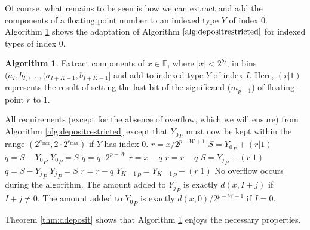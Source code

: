 \documentclass[12pt]{article}
\providecommand{\F}{\ensuremath{\mathbb{F}}}
\providecommand{\max}{\ensuremath{\text{max}}}
\providecommand{\To}{\ensuremath{\text{ to }}}
\theoremstyle{definition}
\newtheorem{alg}{Algorithm}[section]
\numberwithin{equation}{section}
\numberwithin{figure}{section}
\begin{document}
      Of course, what remains to be seen is how we can extract and add the components of a floating point number to an indexed type $Y$ of index 0. Algorithm \ref{alg:deposit} shows the adaptation of Algorithm $\ref{alg:depositrestricted}$ for indexed types of index 0.

      \begin{samepage}
      \begin{alg}
        Extract components of $x \in \F$, where $|x| < 2^{b_I}$, in bins $(a_I, b_I], ..., (a_{I + K - 1}, b_{I + K - 1}]$ and add to indexed type $Y$ of index $I$. Here, $(r | 1)$ represents the result of setting the last bit of the significand ($m_{p - 1}$) of floating-point $r$ to 1.
        \begin{algorithmic}[1]
          \Require
            \Statex All requirements (except for the absence of overflow, which we will ensure) from Algorithm \ref{alg:depositrestricted} except that ${Y_0}_P$ must now be kept within the range $(2^{e_{\max}}, 2 \cdot 2^{e_{\max}})$ if $Y$ has index 0.
              \State $r = x / 2^{p - W + 1}$ \label{alg:deposit:scaler}
              \State $S = {Y_0}_P + (r | 1)$ \label{alg:deposit:formS}
              \State $q = S - {Y_0}_P$ \label{alg:deposit:formq}
              \State ${Y_0}_P = S$
              \State $q = q \cdot 2^{p - W}$ \label{alg:deposit:scaleq}
              \State $r = x - q$ \label{alg:deposit:formr}
              \State $r = r - q$ \label{alg:deposit:formragain}
              \For{$j = 1 \To (K - 2)$}
                \State $S = {Y_j}_P + (r | 1)$
                \State $q = S - {Y_j}_P$
                \State ${Y_j}_P = S$
                \State $r = r - q$
              \EndFor
              \State ${Y_{K - 1}}_P = {Y_{K - 1}}_P + (r | 1)$
            \Else
              \State{} \label{alg:deposit:callrestricted}
            \EndIf
          \EndFunction
          \Ensure
            \Statex No overflow occurs during the algorithm.
            \Statex The amount added to ${Y_j}_P$ is exactly $d(x, I + j)$ if $I + j \neq 0$.
            \Statex The amount added to ${Y_0}_P$ is exactly $d(x, 0)/2^{p - W + 1}$ if $I = 0$.
        \end{algorithmic}
        \label{alg:deposit}
      \end{alg}
      \end{samepage}

      Theorem \ref{thm:ddeposit} shows that Algorithm \ref{alg:deposit} enjoys the necessary properties.
\end{document}
